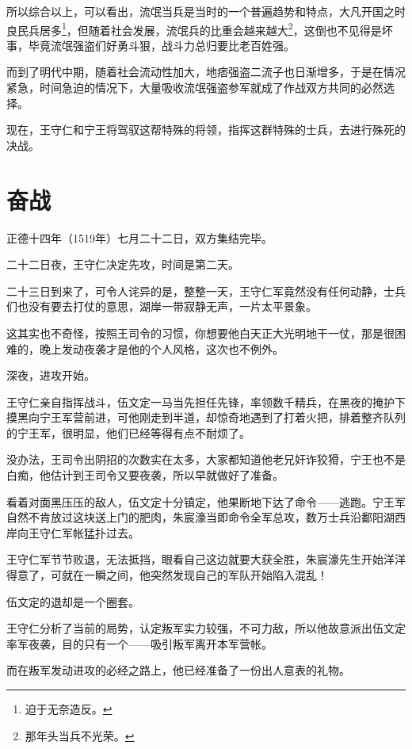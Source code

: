 \begin{multicols}{\theparacolNo}
		所以综合以上，可以看出，流氓当兵是当时的一个普遍趋势和特点，大凡开国之时良民兵居多\footnote{迫于无奈造反。}，但随着社会发展，流氓兵的比重会越来越大\footnote{那年头当兵不光荣。}，这倒也不见得是坏事，毕竟流氓强盗们好勇斗狠，战斗力总归要比老百姓强。

		而到了明代中期，随着社会流动性加大，地痞强盗二流子也日渐增多，于是在情况紧急，时间急迫的情况下，大量吸收流氓强盗参军就成了作战双方共同的必然选择。

		现在，王守仁和宁王将驾驭这帮特殊的将领，指挥这群特殊的士兵，去进行殊死的决战。
		\ifnum{}
	\end{multicols}
\fi
\newpage
\section{奋战}
\ifnum{}
	\begin{multicols}{\theparacolNo}
		\fi
		正德十四年（1519年）七月二十二日，双方集结完毕。

		二十二日夜，王守仁决定先攻，时间是第二天。

		二十三日到来了，可令人诧异的是，整整一天，王守仁军竟然没有任何动静，士兵们也没有要去打仗的意思，湖岸一带寂静无声，一片太平景象。

		这其实也不奇怪，按照王司令的习惯，你想要他白天正大光明地干一仗，那是很困难的，晚上发动夜袭才是他的个人风格，这次也不例外。

		深夜，进攻开始。

		王守仁亲自指挥战斗，伍文定一马当先担任先锋，率领数千精兵，在黑夜的掩护下摸黑向宁王军营前进，可他刚走到半道，却惊奇地遇到了打着火把，排着整齐队列的宁王军，很明显，他们已经等得有点不耐烦了。

		没办法，王司令出阴招的次数实在太多，大家都知道他老兄奸诈狡猾，宁王也不是白痴，他估计到王司令又要夜袭，所以早就做好了准备。

		看着对面黑压压的敌人，伍文定十分镇定，他果断地下达了命令——逃跑。宁王军自然不肯放过这块送上门的肥肉，朱宸濠当即命令全军总攻，数万士兵沿鄱阳湖西岸向王守仁军帐猛扑过去。

		王守仁军节节败退，无法抵挡，眼看自己这边就要大获全胜，朱宸濠先生开始洋洋得意了，可就在一瞬之间，他突然发现自己的军队开始陷入混乱！

		伍文定的退却是一个圈套。

		王守仁分析了当前的局势，认定叛军实力较强，不可力敌，所以他故意派出伍文定率军夜袭，目的只有一个——吸引叛军离开本军营帐。

		而在叛军发动进攻的必经之路上，他已经准备了一份出人意表的礼物。


\end{multicols}

